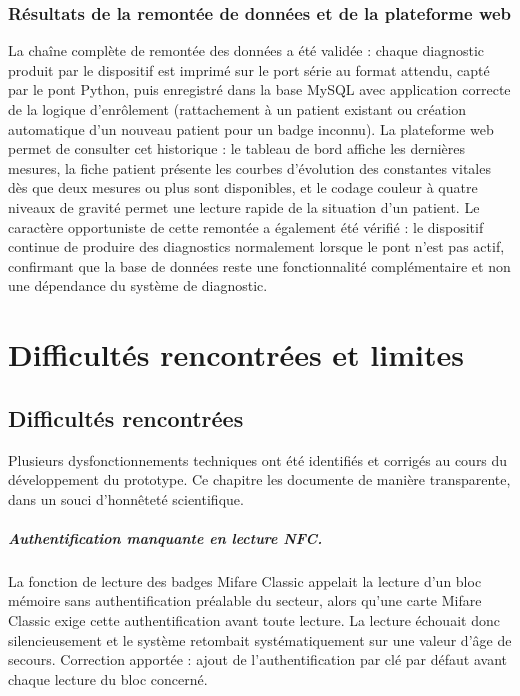\documentclass[12pt,a4paper]{report}
\begin{document}
\subsection*{Résultats de la remontée de données et de la plateforme web}
La chaîne complète de remontée des données a été validée : chaque diagnostic produit par le dispositif est imprimé sur le port série au format attendu, capté par le pont Python, puis enregistré dans la base MySQL avec application correcte de la logique d'enrôlement (rattachement à un patient existant ou création automatique d'un nouveau patient pour un badge inconnu). La plateforme web permet de consulter cet historique : le tableau de bord affiche les dernières mesures, la fiche patient présente les courbes d'évolution des constantes vitales dès que deux mesures ou plus sont disponibles, et le codage couleur à quatre niveaux de gravité permet une lecture rapide de la situation d'un patient. Le caractère opportuniste de cette remontée a également été vérifié : le dispositif continue de produire des diagnostics normalement lorsque le pont n'est pas actif, confirmant que la base de données reste une fonctionnalité complémentaire et non une dépendance du système de diagnostic.

\chapter{Difficultés rencontrées et limites}

\section{Difficultés rencontrées}
Plusieurs dysfonctionnements techniques ont été identifiés et corrigés au cours du développement du prototype. Ce chapitre les documente de manière transparente, dans un souci d'honnêteté scientifique.

\paragraph{Authentification manquante en lecture NFC.} La fonction de lecture des badges Mifare Classic appelait la lecture d'un bloc mémoire sans authentification préalable du secteur, alors qu'une carte Mifare Classic exige cette authentification avant toute lecture. La lecture échouait donc silencieusement et le système retombait systématiquement sur une valeur d'âge de secours. Correction apportée : ajout de l'authentification par clé par défaut avant chaque lecture du bloc concerné.
\end{document}
